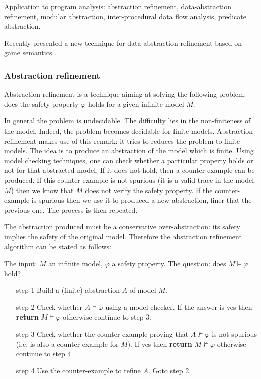Application to program analysis: abstraction refinement,
data-abstraction refinement, modular abstraction, inter-procedural
data flow analysis, predicate abstraction.

Recently \citeauthor{DBLP:conf/sas/DimovskiGL05} presented a new
technique for data-abstraction refinement based on game semantics
\citep{DBLP:conf/sas/DimovskiGL05} .

\subsubsection{Abstraction refinement}

Abstraction refinement is a technique aiming at solving the
following problem: does the safety property $\varphi$ holds for a
given infinite model $M$.

In general the problem is undecidable. The difficulty lies in the
non-finiteness of the model. Indeed, the problem becomes decidable
for finite models. Abstraction refinement makes use of this remark:
it tries to reduces the problem to finite models. The idea is to
produce an abstraction of the model which is finite. Using model
checking techniques, one can check whether a particular property
holds or not for that abstracted model. If it does not hold, then a
counter-example can be produced. If this counter-example is not
spurious (it is a valid trace in the model $M$) then we know that
$M$ does not verify the safety property. If the counter-example is
spurious then we use it to produced a new abstraction, finer that
the previous one. The process is then repeated.

The abstraction produced must be a conservative over-abstraction:
its safety implies the safety of the original model. Therefore the
abstraction refinement algorithm can be stated as follows:

\begin{algo}
The input: $M$ an infinite model, $\varphi$ a safety property. The
question: does $M \models \varphi$ hold?
\begin{enumerate}
\item[step 1] Build a (finite) abstraction $A$ of model $M$.
\item[step 2] Check whether $A \models \varphi$ using a model
checker. If the answer is yes then \textbf{return} $M \models
\varphi$ otherwise continue to step 3.

\item[step 3] Check whether the counter-example proving that $A \not \models
\varphi$ is not spurious (i.e. is also a counter-example for $M$).
If yes then \textbf{return} $M \not\models \varphi$ otherwise
continue to step 4

\item[step 4] Use the counter-example to refine $A$. Goto step 2.
\end{enumerate}
\end{algo}


